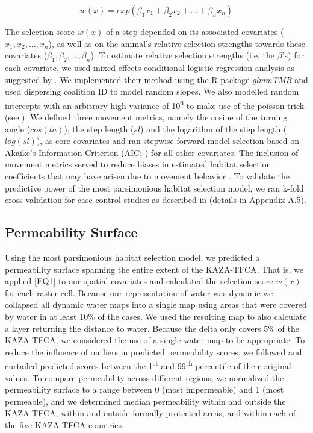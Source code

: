 \documentclass[abstract=on,10pt,a4paper,bibliography=totocnumbered]{article}
\begin{document}
\begin{equation}
\label{EQ1}
  w(x) = exp(\beta_1 x_1 + \beta_2 x_2 + ... + \beta_n x_n)
\end{equation}

\noindent The selection score \(w(x)\) of a step depended on its associated
covariates (\(x_1, x_2, ..., x_n\)), as well as on the animal's relative
selection strengths towards these covariates (\(\beta_1, \beta_2, ...,
\beta_n\)). To estimate relative selection strengths (i.e. the \(\beta\)'s) for
each covariate, we used mixed effects conditional logistic regression analysis
as suggested by \cite{Muff.2020}. We implemented their method using the
R-package \textit{glmmTMB} \citep{Mollie.2017} and used dispersing coalition ID
to model random slopes. We also modelled random intercepts with an arbitrary
high variance of 10\textsuperscript{6} to make use of the poisson trick (see
\citealp{Muff.2020}). We defined three movement metrics, namely the cosine of
the turning angle (\(cos(ta)\)), the step length (\(sl\)) and the logarithm of
the step length (\(log(sl)\)), as core covariates and ran stepwise forward model
selection based on Akaike's Information Criterion (AIC; \citealp{Burnham.2002})
for all other covariates. The inclusion of movement metrics served to reduce
biases in estimated habitat selection coefficients that may have arisen due to
movement behavior \citep{Avgar.2016}. To validate the predictive power of the
most parsimonious habitat selection model, we ran k-fold cross-validation for
case-control studies as described in \cite{Fortin.2009} (details in Appendix
A.5).

\subsection{Permeability Surface}
Using the most parsimonious habitat selection model, we predicted a permeability
surface spanning the entire extent of the KAZA-TFCA. That is, we applied
\ref{EQ1} to our spatial covariates and calculated the selection score \(w(x)\)
for each raster cell. Because our representation of water was dynamic we
collapsed all dynamic water maps into a single map using areas that were covered
by water in at least 10\% of the cases. We used the resulting map to also
calculate a layer returning the distance to water. Because the delta only covers
5\% of the KAZA-TFCA, we considered the use of a single water map to be
appropriate. To reduce the influence of outliers in predicted permeability
scores, we followed \cite{Squires.2013} and curtailed predicted scores between
the 1\textsuperscript{st} and 99\textsuperscript{th} percentile of their
original values. To compare permeability across different regions, we normalized
the permeability surface to a range between 0 (most impermeable) and 1 (most
permeable), and we determined median permeability within and outside the
KAZA-TFCA, within and outside formally protected areas, and within each of the
five KAZA-TFCA countries.
\end{document}
